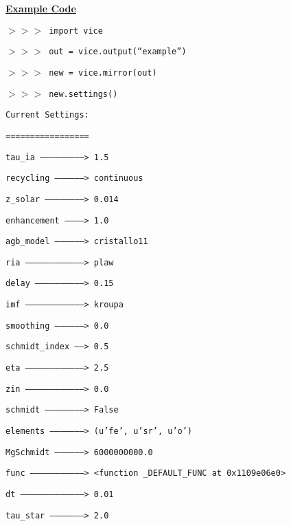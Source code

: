 \documentclass{report}
\begin{document}
\par\null\par\noindent 
\underline{\textbf{Example Code}} 
\par\noindent 
\texttt{$>>>$ import vice} \par\noindent 
\texttt{$>>>$ out = vice.output(``example'')} \par\noindent 
\texttt{$>>>$ new = vice.mirror(out)} \par\noindent 
\texttt{$>>>$ new.settings()} \par\noindent 
\texttt{Current Settings:} \par\noindent 
\texttt{=================} \par\noindent 
\texttt{tau\_ia ---------------------------> 1.5} \par\noindent 
\texttt{recycling ------------------> continuous} \par\noindent 
\texttt{z\_solar ------------------------> 0.014} \par\noindent 
\texttt{enhancement ------------> 1.0} \par\noindent 
\texttt{agb\_model ------------------> cristallo11} \par\noindent 
\texttt{ria ------------------------------------> plaw} \par\noindent 
\texttt{delay ------------------------------> 0.15} \par\noindent 
\texttt{imf ------------------------------------> kroupa} \par\noindent 
\texttt{smoothing ------------------> 0.0} \par\noindent 
\texttt{schmidt\_index ------> 0.5} \par\noindent 
\texttt{eta ------------------------------------> 2.5} \par\noindent 
\texttt{zin ------------------------------------> 0.0} \par\noindent 
\texttt{schmidt ------------------------> False} \par\noindent 
\texttt{elements ---------------------> (u'fe', u'sr', u'o')} \par\noindent 
\texttt{MgSchmidt ------------------> 6000000000.0} \par\noindent 
\texttt{func ---------------------------------> <function \_DEFAULT\_FUNC 
at 0x1109e06e0>} \par\noindent 
\texttt{dt ---------------------------------------> 0.01} \par\noindent 
\texttt{tau\_star ---------------------> 2.0} \par\noindent 
\end{document}
